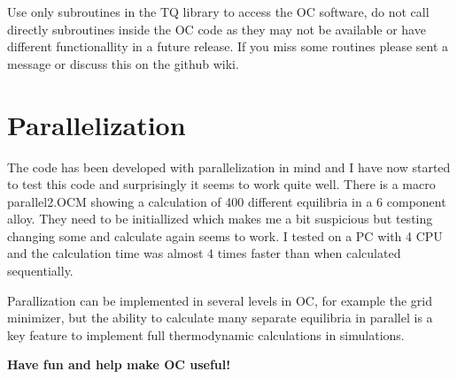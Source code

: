 \documentclass[12pt]{article}
\begin{document}
Use only subroutines in the TQ library to access the OC software, do
not call directly subroutines inside the OC code as they may not be
available or have different functionallity in a future release.  If
you miss some routines please sent a message or discuss this on the
github wiki.

\section{Parallelization}

The code has been developed with parallelization in mind and I have
now started to test this code and surprisingly it seems to work quite
well.  There is a macro parallel2.OCM showing a calculation of 400
different equilibria in a 6 component alloy.  They need to be
initiallized which makes me a bit suspicious but testing changing some
and calculate again seems to work.  I tested on a PC with 4 CPU and
the calculation time was almost 4 times faster than when calculated
sequentially.

Parallization can be implemented in several levels in OC, for example
the grid minimizer, but the ability to calculate many separate
equilibria in parallel is a key feature to implement full
thermodynamic calculations in simulations.

\bigskip

{\large \bf Have fun and help make OC useful!}
\end{document}
